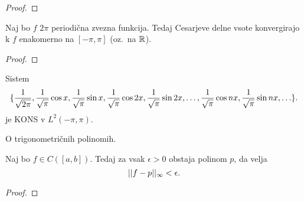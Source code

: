 \begin{proof}
    \todo{}
\end{proof}

\begin{izrek}
    Naj bo \(f\) \(2\pi\) periodična zvezna funkcija. Tedaj Cesarjeve delne vsote konvergirajo k \(f\) enakomerno na \([-\pi, \pi]\) (oz.\ na \(\mathbb{R}\)).
\end{izrek}

\begin{proof}
    \todo{}
\end{proof}

\begin{izrek}
    Sistem
    \[
        \{\frac{1}{\sqrt{2\pi}}, \frac{1}{\sqrt{\pi}} \cos x, \frac{1}{\sqrt{\pi}} \sin x, \frac{1}{\sqrt{\pi}} \cos 2x, \frac{1}{\sqrt{\pi}} \sin 2x, \ldots, \frac{1}{\sqrt{\pi}} \cos nx, \frac{1}{\sqrt{\pi}} \sin nx, \ldots\}.
    \]
    je KONS v \(L^2(-\pi, \pi)\).
\end{izrek}

\begin{opomba}
    O trigonometričnih polinomih. \todo{}
\end{opomba}

\begin{izrek}
    Naj bo \(f \in C([a,b])\). Tedaj za vsak \(\epsilon > 0\) obstaja polinom \(p\), da velja 
    \[
        ||f - p||_\infty < \epsilon.
    \]
\end{izrek}

\begin{proof}
    \todo{}
\end{proof}


